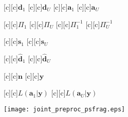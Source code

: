 \documentclass{article}
\begin{document}
\begin{figure}[htb]
  \begin{center}


        [c][c]{$\mathrm{\mathbf{d}}_1$}
        [c][c]{$\mathrm{\mathbf{d}}_U$}
        [c][c]{$\mathrm{\mathbf{a}}_1$}
        [c][c]{$\mathrm{\mathbf{a}}_U$}

        [c][c]{\tiny$\Pi_1$}
        [c][c]{\tiny$\Pi_U$}
        [c][c]{\tiny$\Pi_1^{-1}$}
        [c][c]{\tiny$\Pi_U^{-1}$}

        [c][c]{$\mathrm{\mathbf{s}}_1$}
        [c][c]{$\mathrm{\mathbf{s}}_U$}

        [c][c]{$\mathrm{\mathbf{\hat{d}}}_1$}
        [c][c]{$\mathrm{\mathbf{\hat{d}}}_U$}

        [c][c]{$\mathrm{\mathbf{n}}$}
        [c][c]{$\mathrm{\mathbf{y}}$}

        [c][c]{\hspace{4mm}$L(\mathrm{\mathbf{a}}_1\vert \mathrm{\mathbf{y}})$}
        [c][c]{\hspace{4mm}$L(\mathrm{\mathbf{a}}_U\vert \mathrm{\mathbf{y}})$}


    \texttt{[image: joint\_preproc\_psfrag.eps]}
    \end{center}
\end{figure}
\end{document}
